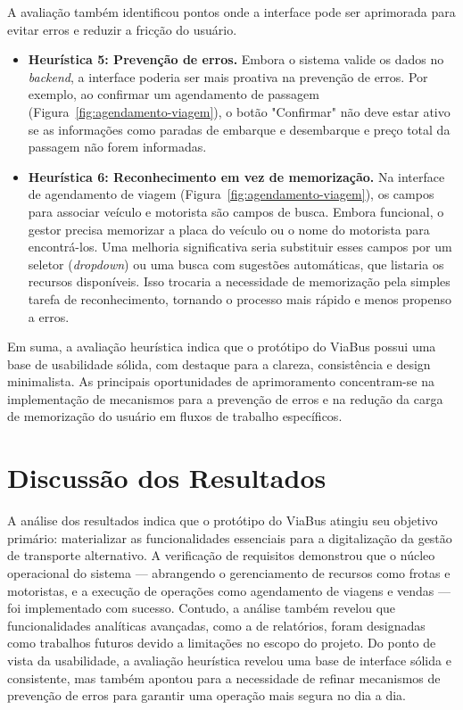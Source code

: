 A avaliação também identificou pontos onde a interface pode ser aprimorada para evitar erros e reduzir a fricção do usuário.

\begin{itemize}
  \item \textbf{Heurística 5: Prevenção de erros.} Embora o sistema valide os dados no \textit{backend}, a interface poderia ser mais proativa na prevenção de erros. Por exemplo, ao confirmar um agendamento de passagem (Figura~\ref{fig:agendamento-viagem}), o botão "Confirmar" não deve estar ativo se as informações como paradas de embarque e desembarque e preço total da passagem não forem informadas.

  \item \textbf{Heurística 6: Reconhecimento em vez de memorização.} Na interface de agendamento de viagem (Figura~\ref{fig:agendamento-viagem}), os campos para associar veículo e motorista são campos de busca. Embora funcional, o gestor precisa memorizar a placa do veículo ou o nome do motorista para encontrá-los. Uma melhoria significativa seria substituir esses campos por um seletor (\textit{dropdown}) ou uma busca com sugestões automáticas, que listaria os recursos disponíveis. Isso trocaria a necessidade de memorização pela simples tarefa de reconhecimento, tornando o processo mais rápido e menos propenso a erros.
\end{itemize}

Em suma, a avaliação heurística indica que o protótipo do ViaBus possui uma base de usabilidade sólida, com destaque para a clareza, consistência e design minimalista. As principais oportunidades de aprimoramento concentram-se na implementação de mecanismos para a prevenção de erros e na redução da carga de memorização do usuário em fluxos de trabalho específicos.
\section{Discussão dos Resultados}

A análise dos resultados indica que o protótipo do ViaBus atingiu seu objetivo primário: materializar as funcionalidades essenciais para a digitalização da gestão de transporte alternativo. A verificação de requisitos demonstrou que o núcleo operacional do sistema — abrangendo o gerenciamento de recursos como frotas e motoristas, e a execução de operações como agendamento de viagens e vendas — foi implementado com sucesso. Contudo, a análise também revelou que funcionalidades analíticas avançadas, como a de relatórios, foram designadas como trabalhos futuros devido a limitações no escopo do projeto. Do ponto de vista da usabilidade, a avaliação heurística revelou uma base de interface sólida e consistente, mas também apontou para a necessidade de refinar mecanismos de prevenção de erros para garantir uma operação mais segura no dia a dia.

